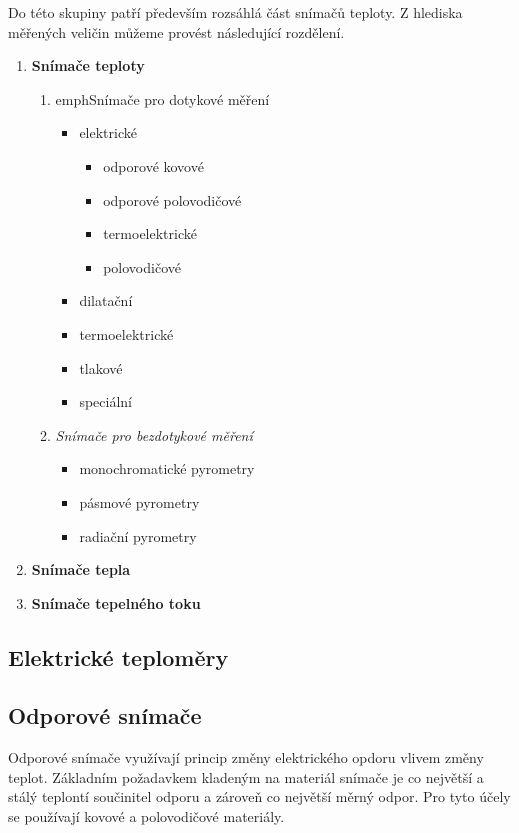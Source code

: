     Do této skupiny patří především rozsáhlá část snímačů teploty. Z hlediska měřených veličin
    můžeme provést následující rozdělení.
    \begin{enumerate}[noitemsep]
      \item \textbf{Snímače teploty}
        \begin{enumerate}[label=\emph{\alph*}),noitemsep]
          \item emph{Snímače pro dotykové měření} 
            \begin{itemize}
              \item elektrické
               \begin{itemize}
                 \item odporové kovové
                 \item odporové polovodičové
                 \item termoelektrické
                 \item polovodičové 
               \end{itemize}   
              \item dilatační
              \item termoelektrické
              \item tlakové
              \item speciální
            \end{itemize}
          \item \emph{Snímače pro bezdotykové měření}
            \begin{itemize}
              \item monochromatické pyrometry
              \item pásmové pyrometry
              \item radiační pyrometry
            \end{itemize}
        \end{enumerate}
      \item \textbf{Snímače tepla}
      \item \textbf{Snímače tepelného toku}
    \end{enumerate}  
       
      \subsection{Elektrické teploměry}
        \subsection{Odporové snímače}
          Odporové snímače využívají princip změny elektrického opdoru vlivem změny teplot.
          Základním požadavkem kladeným na materiál snímače je co největší a stálý teplontí
          součinitel odporu a zároveň co největší měrný odpor. Pro tyto účely se používají kovové a
          polovodičové materiály.
          
